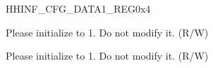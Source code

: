 


\begin{register}{H}{HINF\_CFG\_DATA1\_REG}{0x4}\label{regdesc:HINFCFGDATA1REG}
%
%
%
\regnewline%
\begin{regdesc}\begin{reglist}
\item [HINF\_HIGHSPEED\_ENABLE]Please initialize to 1. Do not modify it. (R/W)
\item [HINF\_SDIO\_IOREADY1]Please initialize to 1. Do not modify it. (R/W)
\end{reglist}\end{regdesc}
\end{register}



